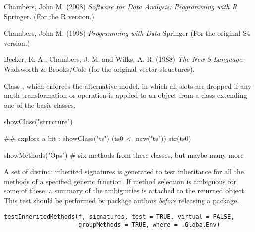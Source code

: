 %
\begin{References}\relax
Chambers, John M. (2008)
\emph{Software for Data Analysis: Programming with R}
Springer.  (For the R version.)

Chambers, John M. (1998)
\emph{Programming with Data}
Springer (For the original S4 version.)

Becker, R. A., Chambers, J. M. and Wilks, A. R. (1988)
\emph{The New S Language}.
Wadsworth \& Brooks/Cole (for the original vector structures).
\end{References}
%
\begin{SeeAlso}\relax
Class , which enforces the
alternative model, in which all slots are dropped if any math
transformation or operation is applied to an object from a class
extending one of the basic classes.
\end{SeeAlso}
%
\begin{Examples}
\begin{ExampleCode}
showClass("structure")

## explore a bit :
showClass("ts")
(ts0 <- new("ts"))
str(ts0)

showMethods("Ops") # six methods from these classes, but maybe many more
\end{ExampleCode}
\end{Examples}
%
\begin{Description}\relax
A set of distinct inherited signatures is generated to test
inheritance for all the methods of a specified generic function.  If
method selection is ambiguous for some of these, a summary of the
ambiguities is attached to the returned object.  This test should be
performed by package authors \emph{before} releasing a package.
\end{Description}
%
\begin{Usage}
\begin{verbatim}
testInheritedMethods(f, signatures, test = TRUE, virtual = FALSE,
                     groupMethods = TRUE, where = .GlobalEnv)
\end{verbatim}
\end{Usage}
%
